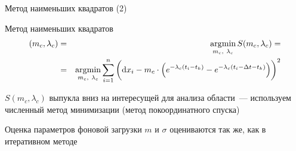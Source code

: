 \documentclass[utf8]{beamer}
\DeclareMathOperator*{\argmin}{\arg\!\min}
\begin{document}
\begin{frame}{Метод наименьших квадратов (2)}
\begin{block}{Метод наименьших квадратов}
\begin{eqnarray*}
\del{m_c, \lambda_c} 
  & = & \argmin\limits_{m_c,\ \lambda_c} S(m_c, \lambda_c) = \\
  & = & \argmin\limits_{m_c,\ \lambda_c} \sum\limits_{i=1}^{n} 
    \del{\dif x_i - m_c \cdot 
      \del{e^{-\lambda_c(t_i - t_k)} - 
           e^{-\lambda_c(t_i - \Delta t - t_k)}}}^2
\end{eqnarray*}
\end{block}
$S(m_c, \lambda_c)$ выпукла вниз на интересущей для анализа области~---
используем численный метод минимизации (метод покоординатного спуска)
\end{frame}


\begin{frame}{Оценка параметров фоновой загрузки}
$m$ и $\sigma$ оцениваются так же, как в итеративном методе
\end{frame}






\end{document}

